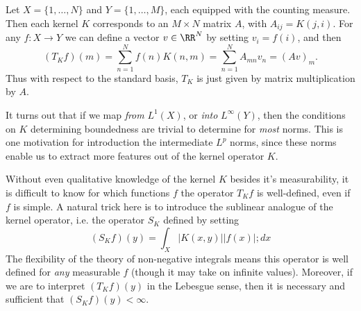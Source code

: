 \begin{example}
  Let $X = \{ 1, \dots, N \}$ and $Y = \{ 1, \dots, M \}$, each equipped with the counting measure. Then each kernel $K$ corresponds to an $M \times N$ matrix $A$, with $A_{ij} = K(j,i)$. For any $f: X \to Y$ we can define a vector $v \in \RR^N$ by setting $v_i = f(i)$, and then
  \[ (T_K f)(m) = \sum_{n = 1}^N f(n) K(n,m) = \sum_{n = 1}^N A_{mn} v_n = (Av)_m. \]
  Thus with respect to the standard basis, $T_K$ is just given by matrix multiplication by $A$.
\end{example}

It turns out that if we map \emph{from} $L^1(X)$, or \emph{into} $L^\infty(Y)$, then the conditions on $K$ determining boundedness are trivial to determine for \emph{most} norms. This is one motivation for introduction the intermediate $L^p$ norms, since these norms enable us to extract more features out of the kernel operator $K$.

Without even qualitative knowledge of the kernel $K$ besides it's measurability, it is difficult to know for which functions $f$ the operator $T_K f$ is well-defined, even if $f$ is simple. A natural trick here is to introduce the sublinear analogue of the kernel operator, i.e. the operator $S_K$ defined by setting
%
\[ (S_K f)(y) = \int_X |K(x,y)| |f(x)|; dx \]
%
The flexibility of the theory of non-negative integrals means this operator is well defined for \emph{any} measurable $f$ (though it may take on infinite values). Moreover, if we are to interpret $(T_K f)(y)$ in the Lebesgue sense, then it is necessary and sufficient that $(S_K f)(y) < \infty$.

